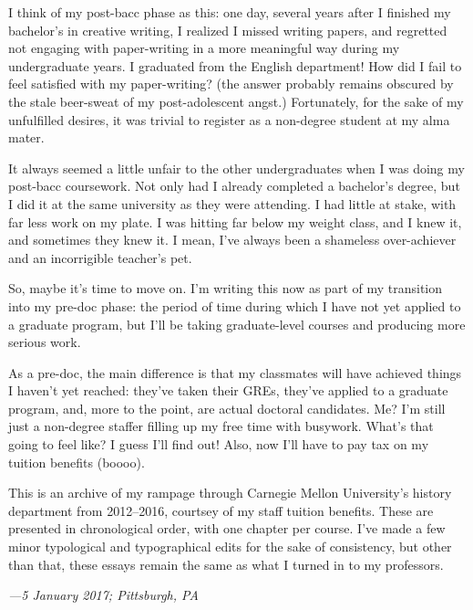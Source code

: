 I think of my post-bacc phase as this: one day, several years after I finished
my bachelor's in creative writing, I realized I missed writing papers, and
regretted not engaging with paper-writing in a more meaningful way during my
undergraduate years. I graduated from the English department! How did I fail to
feel satisfied with my paper-writing? (the answer probably remains obscured by
the stale beer-sweat of my post-adolescent angst.) Fortunately, for the sake of
my unfulfilled desires, it was trivial to register as a non-degree student at my
alma mater.

It always seemed a little unfair to the other undergraduates when I was doing my
post-bacc coursework. Not only had I already completed a bachelor's degree, but
I did it at the same university as they were attending. I had little at stake,
with far less work on my plate. I was hitting far below my weight class, and I
knew it, and sometimes they knew it. I mean, I've always been a shameless
over-achiever and an incorrigible teacher's pet.

So, maybe it's time to move on. I'm writing this now as part of my transition
into my pre-doc phase: the period of time during which I have not yet applied to
a graduate program, but I'll be taking graduate-level courses and producing more
serious work.

As a pre-doc, the main difference is that my classmates will have achieved
things I haven't yet reached: they've taken their GREs, they've applied to a
graduate program, and, more to the point, are actual doctoral candidates. Me?
I'm still just a non-degree staffer filling up my free time with busywork.
What's that going to feel like? I guess I'll find out! Also, now I'll have to
pay tax on my tuition benefits (boooo).

This is an archive of my rampage through Carnegie Mellon University's history
department from 2012--2016, courtsey of my staff tuition benefits. These are
presented in chronological order, with one chapter per course. I've made a few
minor typological and typographical edits for the sake of consistency, but other
than that, these essays remain the same as what I turned in to my professors.

\textit{---5 January 2017; Pittsburgh, PA}
